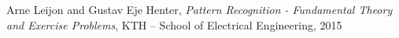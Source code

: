 \documentclass[twocolumn, 10pt]{IEEEtran}
\begin{document}
\begin{thebibliography}{1}

Arne Leijon and Gustav Eje Henter, \emph{Pattern Recognition - Fundamental Theory and Exercise Problems}, KTH – School of Electrical Engineering, 2015







\end{thebibliography}
\end{document}
